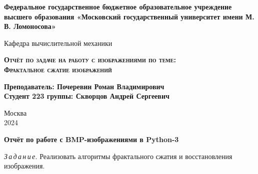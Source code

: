 \documentclass{article}
\begin{document}
\begin{titlepage}
	\newpage
	
	\begin{center}
		\textbf{Федеральное государственное бюджетное образовательное учреждение высшего образования «Московский государственный университет имени М. В. Ломоносова»}\\
	\end{center}
	
	\vspace{8em}
	
	\begin{center}
		\Large Кафедра вычислительной механики \\ 
	\end{center}
	
	\vspace{2em}
	
	\begin{center}
		\Large \textsc{\textbf{Отчёт по задаче на работу с изображениями по теме:}}
		\\
		\Large \textsc{\textbf{ Фрактальное сжатие изображений \linebreak}}
	\end{center}
	
	\vspace{15em}
	
	
	
	\begin{flushright}
		\small
		\textbf{Преподаватель: Почеревин Роман Владимирович}\\
		\textbf{Студент 223 группы: Скворцов Андрей Сергеевич}\\
	\end{flushright}
	
	
	\vspace{\fill}
	
	\begin{center}
		Москва \\2024
	\end{center}
	
\end{titlepage}

\begin{center}

{\large\bf Отчёт по работе с BMP-изображениями в Python-3}

\end{center}

\textit{З\,а\,д\,а\,н\,и\,е.} Реализовать алгоритмы фрактального сжатия и восстановления изображения.
\end{document}
